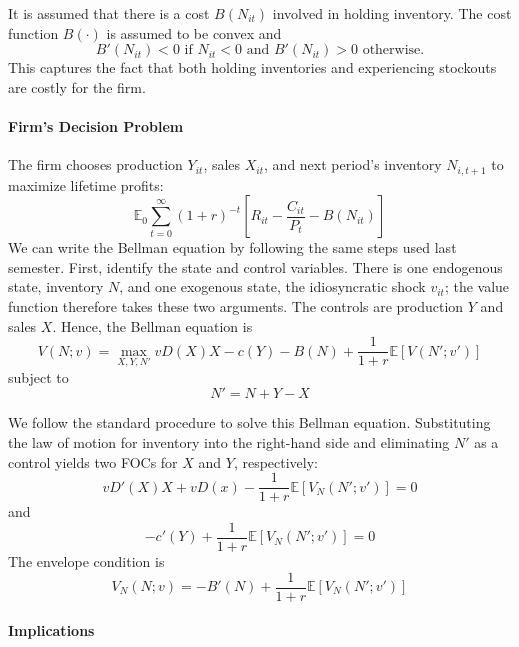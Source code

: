 \documentclass[12pt]{article}
\begin{document}
	It is assumed that there is a cost $B(N_{it})$ involved in holding inventory. The cost function $B(\cdot)$ is assumed to be convex and 
	\[B'(N_{it}) < 0 \text{ if $N_{it} < 0$ and } B'(N_{it}) > 0 \text{ otherwise.}\] 
		This captures the fact that both holding inventories and experiencing stockouts are costly for the firm. 
	
	\paragraph{Firm's Decision Problem \\ [6pt]}
	
		The firm chooses production $Y_{it}$, sales $X_{it}$, and next period's inventory $N_{i,t+1}$ to maximize lifetime profits:
	\begin{equation}
		\mathbb{E}_0 \sum_{t=0}^\infty (1+r)^{-t} \left[R_{it} - \frac{C_{it}}{P_t} - B(N_{it})\right] 
	\end{equation}
We can write the Bellman equation by following the same steps used last semester. First, identify the state and control variables. There is one endogenous state, inventory $N$, and one exogenous state, the idiosyncratic shock $v_{it}$; the value function therefore takes these two arguments. The controls are production $Y$ and sales $X$. Hence, the Bellman equation is
\begin{equation}
	V(N; v) = \max_{X, Y, N'} v D(X) X - c(Y) - B(N) + \frac{1}{1+r} \mathbb{E}[V(N'; v')]
\end{equation}
subject to 
\[N' = N + Y - X\]

We follow the standard procedure to solve this Bellman equation. Substituting the law of motion for inventory into the right-hand side and eliminating $N'$ as a control yields two FOCs for $X$ and $Y$, respectively:
\begin{equation} \label{eq:foc_x}
	v D'(X) X + v D(x) - \frac{1}{1+r} \mathbb{E}[V_N(N'; v')] = 0
\end{equation}
and 
\begin{equation} \label{eq:foc_y}
	-c'(Y) + \frac{1}{1+r} \mathbb{E}[V_N(N'; v')] = 0
\end{equation}
The envelope condition is
\begin{equation} \label{eq:envelope}
	V_N(N; v) = - B'(N) + \frac{1}{1+r} \mathbb{E}[V_N(N';v')]
\end{equation}

\paragraph{Implications \\ [6pt]}
\end{document}
